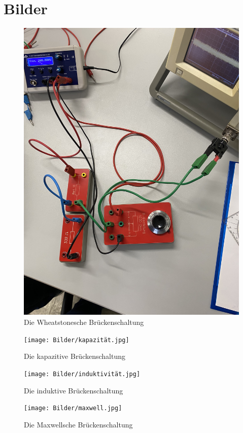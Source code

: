 \section{Bilder}

\begin{figure}
    \centering
    \includegraphics{Bilder/wheat.jpg}
    \caption{Die Wheatstonesche Brückenschaltung}
    \label{fig:wheat}
  \end{figure}
  \begin{figure}
    \centering
    \texttt{[image: Bilder/kapazität.jpg]}
    \caption{Die kapazitive Brückenschaltung}
    \label{fig:kapaz}
  \end{figure}
  \begin{figure}
    \centering
    \texttt{[image: Bilder/induktivität.jpg]}
    \caption{Die induktive Brückenschaltung}
    \label{fig:induk}
  \end{figure}
  \begin{figure}
    \centering
    \texttt{[image: Bilder/maxwell.jpg]}
    \caption{Die Maxwellsche Brückenschaltung}
    \label{fig:max}
  \end{figure}
